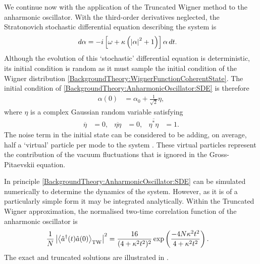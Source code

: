 We continue now with the application of the Truncated Wigner method to the anharmonic oscillator.  With the third-order derivatives neglected, the Stratonovich stochastic differential equation describing the system is
\begin{align}
    d \alpha &= -i \left[\omega + \kappa \left(\abs{\alpha}^2 + 1\right) \right] \alpha \, dt. \label{BackgroundTheory:AnharmonicOscillator:SDE}
\end{align}
Although the evolution of this `stochastic' differential equation is deterministic, its initial condition is random as it must sample the initial condition of the Wigner distribution \eqref{BackgroundTheory:WignerFunctionCoherentState}.  The initial condition of \eqref{BackgroundTheory:AnharmonicOscillator:SDE} is therefore
\begin{align}
    \alpha(0) &= \alpha_0 + \frac{1}{\sqrt{2}} \eta,
\end{align}
where $\eta$ is a complex Gaussian random variable satisfying
\begin{align}
    \overline{\eta} &= 0, & \overline{\eta \eta} &= 0, & \overline{\eta^* \eta} &= 1.
\end{align}
The noise term in the initial state can be considered to be adding, on average, half a `virtual' particle per mode to the system \citep{Scott:2007}.  These virtual particles represent the contribution of the vacuum fluctuations that is ignored in the Gross-Pitaevskii equation.

In principle \eqref{BackgroundTheory:AnharmonicOscillator:SDE} can be simulated numerically to determine the dynamics of the system.  However, as it is of a particularly simple form it may be integrated analytically.  Within the Truncated Wigner approximation, the normalised two-time correlation function of the anharmonic oscillator is
\begin{align}
    \frac{1}{N} \left| {\big<\hat{a}^\dagger(t) \hat{a}(0)\big>}_\text{TW}\right|^2 &= \frac{16}{(4 + \kappa^2 t^2)^2} \exp\left(\frac{- 4 N \kappa^2 t^2}{4 + \kappa^2 t^2} \right).
\end{align}
The exact and truncated solutions are illustrated in .

